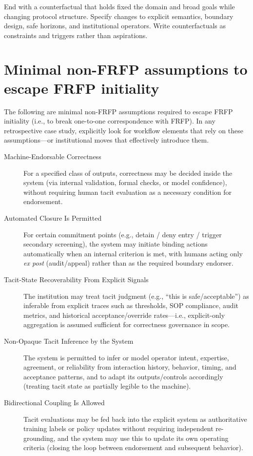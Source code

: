 End with a counterfactual that holds fixed the domain and broad goals while changing protocol structure. Specify changes to explicit semantics, boundary design, safe horizons, and institutional operators. Write counterfactuals as constraints and triggers rather than aspirations.

\section{Minimal non-FRFP assumptions to escape FRFP initiality}
The following are minimal non-FRFP assumptions required to escape FRFP initiality (i.e., to break one-to-one correspondence with FRFP). In any retrospective case study, explicitly look for workflow elements that rely on these assumptions—or institutional moves that effectively introduce them.
\begin{description}

\item[Machine-Endorsable Correctness]
For a specified class of outputs, correctness may be decided inside the system (via internal validation, formal checks, or model confidence), without requiring human tacit evaluation as a necessary condition for endorsement.

\item[Automated Closure Is Permitted]
For certain commitment points (e.g., detain / deny entry / trigger secondary screening), the system may initiate binding actions automatically when an internal criterion is met, with humans acting only \emph{ex post} (audit/appeal) rather than as the required boundary endorser.

\item[Tacit-State Recoverability From Explicit Signals]
The institution may treat tacit judgment (e.g., ``this is safe/acceptable'') as inferable from explicit traces such as thresholds, SOP compliance, audit metrics, and historical acceptance/override rates---i.e., explicit-only aggregation is assumed sufficient for correctness governance in scope.

\item[Non-Opaque Tacit Inference by the System]
The system is permitted to infer or model operator intent, expertise, agreement, or reliability from interaction history, behavior, timing, and acceptance patterns, and to adapt its outputs/controls accordingly (treating tacit state as partially legible to the machine).

\item[Bidirectional Coupling Is Allowed]
Tacit evaluations may be fed back into the explicit system as authoritative training labels or policy updates without requiring independent re-grounding, and the system may use this to update its own operating criteria (closing the loop between endorsement and subsequent behavior).


\end{description}

